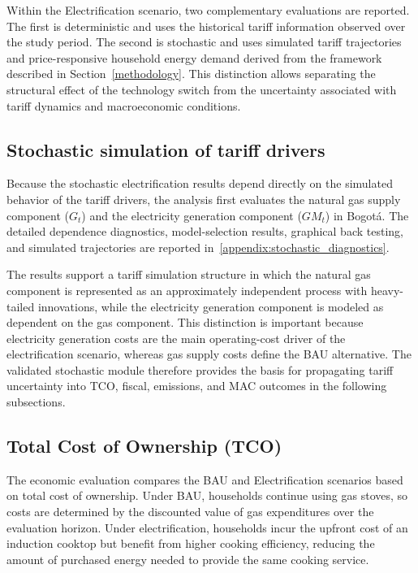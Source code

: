 \documentclass[authoryear,preprint,review,10pt]{elsarticle}
\begin{document}
Within the Electrification scenario, two complementary evaluations are reported. The first is deterministic and uses the historical tariff information observed over the study period. The second is stochastic and uses simulated tariff trajectories and price-responsive household energy demand derived from the framework described in Section~\ref{methodology}. This distinction allows separating the structural effect of the technology switch from the uncertainty associated with tariff dynamics and macroeconomic conditions.

\subsection{Stochastic simulation of tariff drivers}
\label{results:simulation}

Because the stochastic electrification results depend directly on the simulated behavior of the tariff drivers, the analysis first evaluates the natural gas supply component ($G_t$) and the electricity generation component ($GM_t$) in Bogotá. The detailed dependence diagnostics, model-selection results, graphical back testing, and simulated trajectories are reported in~\ref{appendix:stochastic_diagnostics}.

The results support a tariff simulation structure in which the natural gas component is represented as an approximately independent process with heavy-tailed innovations, while the electricity generation component is modeled as dependent on the gas component. This distinction is important because electricity generation costs are the main operating-cost driver of the electrification scenario, whereas gas supply costs define the BAU alternative. The validated stochastic module therefore provides the basis for propagating tariff uncertainty into TCO, fiscal, emissions, and MAC outcomes in the following subsections.

\subsection{Total Cost of Ownership (TCO)}
\label{results:tco}

The economic evaluation compares the BAU and Electrification scenarios based on total cost of ownership. Under BAU, households continue using gas stoves, so costs are determined by the discounted value of gas expenditures over the evaluation horizon. Under electrification, households incur the upfront cost of an induction cooktop but benefit from higher cooking efficiency, reducing the amount of purchased energy needed to provide the same cooking service.
\end{document}
